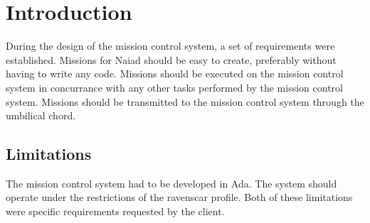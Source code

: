 \section{Introduction}\label{sec:introduction}
During the design of the mission control system, a set of requirements were established. Missions for Naiad should be easy to create, preferably without having to write any code. Missions should be executed on the mission control system in concurrance with any other tasks performed by the mission control system. Missions should be transmitted to the mission control system through the umbilical chord.

\subsection{Limitations}
The mission control system had to be developed in Ada. The system should operate under the restrictions of the ravenscar profile. Both of these limitations were specific requirements requested by the client.